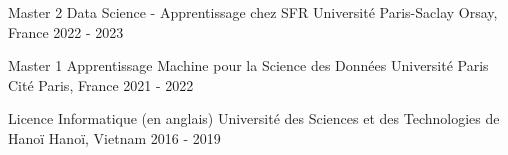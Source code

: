 

\begin{cventries}
\renewcommand*{\acvPositionCase}[1]{#1} %

  \cventry
    {Master 2 Data Science - Apprentissage chez SFR} %
    {Université Paris-Saclay} %
    {Orsay, France} %
    {2022 - 2023} %
    {}

  \cventry
    {Master 1 Apprentissage Machine pour la Science des Données} %
    {Université Paris Cité} %
    {Paris, France} %
    {2021 - 2022} %
    {}

  \cventry
    {Licence Informatique (en anglais)} %
    {Université des Sciences et des Technologies de Hanoï} %
    {Hanoï, Vietnam} %
    {2016 - 2019} %
    {}

\end{cventries}
